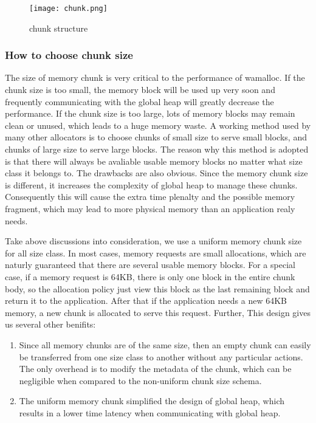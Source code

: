 \documentclass{vldb}
\begin{document}
\begin{figure}[h]
\centering
\texttt{[image: chunk.png]}
\caption{chunk structure}
\label{fig:chunk}
\end{figure}

\subsubsection{How to choose chunk size}
The size of memory chunk is very critical to the performance of wamalloc. 
If the chunk size is too small, the memory block will be used up very soon and frequently communicating with the global heap will greatly decrease the performance.
If the chunk size is too large, lots of memory blocks may remain clean or unused, which leads to a huge memory waste. 
A working method used by many other allocators is to choose chunks of small size to serve small blocks, and chunks of large size to serve large blocks.
The reason why this method is adopted is that there will always be avaliable usable memory blocks no matter what size class it belongs to.
The drawbacks are also obvious.
Since the memory chunk size is different, it increases the complexity of global heap to manage these chunks.
Consequently this will cause the extra time plenalty and the possible memory fragment, which may lead to more physical memory than an application realy needs.

Take above discussions into consideration, we use a uniform memory chunk size for all size class. 
In most cases, memory requests are small allocations, which are naturly guaranteed that there are several usable memory blocks. 
For a special case, if a memory request is 64KB, there is only one block in the entire chunk body, so the allocation policy just view this block as the last remaining block 
and return it to the application. 
After that if the application needs a new 64KB memory, a new chunk is allocated to serve this request.
Further, This design gives us several other benifits: 
\begin{enumerate}
    \item Since all memory chunks are of the same size, then an empty chunk can easily be transferred from one size class to another without any particular actions.
The only overhead is to modify the metadata of the chunk, which can be negligible when compared to the non-uniform chunk size schema. 
    \item The uniform memory chunk simplified the design of global heap, which results in a lower time latency when communicating with global heap.
\end{enumerate}
\end{document}
